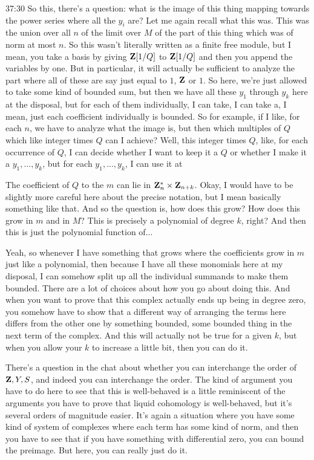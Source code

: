 \begin{unfinished}{37:30}
So this, there's a question: what is the image of this thing mapping towards the power series where all the $y_i$ are? Let me again recall what this was. This was the union over all $n$ of the limit over $M$ of the part of this thing which was of norm at most $n$. So this wasn't literally written as a finite free module, but I mean, you take a basis by giving $\mathbf Z[1/Q]$ to $\mathbf Z[1/Q]$ and then you append the variables by one. But in particular, it will actually be sufficient to analyze the part where all of these are say just equal to $1$, $\mathbf Z$ or $1$. So here, we're just allowed to take some kind of bounded sum, but then we have all these $y_1$ through $y_k$ here at the disposal, but for each of them individually, I can take, I can take a, I mean, just each coefficient individually is bounded. So for example, if I like, for each $n$, we have to analyze what the image is, but then which multiples of $Q$ which like integer times $Q$ can I achieve? Well, this integer times $Q$, like, for each occurrence of $Q$, I can decide whether I want to keep it a $Q$ or whether I make it a $y_1,...,y_k$, but for each $y_1,...,y_k$, I can use it at

The coefficient of $Q$ to the $m$ can lie in $\mathbf Z_n^* \times \mathbf Z_{n+k}$. Okay, I would have to be slightly more careful here about the precise notation, but I mean basically something like that. And so the question is, how does this grow? How does this grow in $m$ and in $M$? This is precisely a polynomial of degree $k$, right? And then this is just the polynomial function of...

Yeah, so whenever I have something that grows where the coefficients grow in $m$ just like a polynomial, then because I have all these monomials here at my disposal, I can somehow split up all the individual summands to make them bounded. There are a lot of choices about how you go about doing this. And when you want to prove that this complex actually ends up being in degree zero, you somehow have to show that a different way of arranging the terms here differs from the other one by something bounded, some bounded thing in the next term of the complex. And this will actually not be true for a given $k$, but when you allow your $k$ to increase a little bit, then you can do it.

There's a question in the chat about whether you can interchange the order of $\mathbf Z , Y ,S$, and indeed you can interchange the order. The kind of argument you have to do here to see that this is well-behaved is a little reminiscent of the arguments you have to prove that liquid cohomology is well-behaved, but it's several orders of magnitude easier. It's again a situation where you have some kind of system of complexes where each term has some kind of norm, and then you have to see that if you have something with differential zero, you can bound the preimage. But here, you can really just do it.
\end{unfinished}

